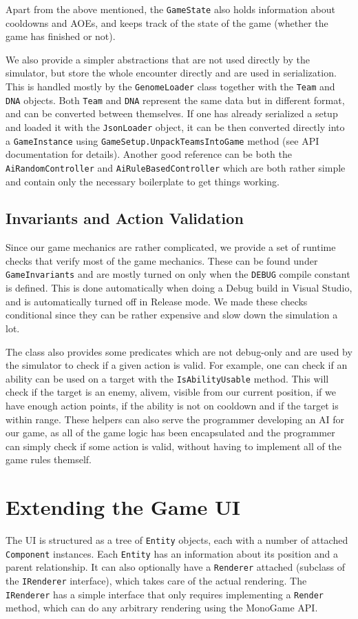 Apart from the above mentioned, the \verb|GameState| also holds information about cooldowns and AOEs, and keeps track of the state of the game (whether the game has finished or not).

We also provide a simpler abstractions that are not used directly by the simulator, but store the whole encounter directly and are used in serialization. This is handled mostly by the \verb|GenomeLoader| class together with the \verb|Team| and \verb|DNA| objects. Both \verb|Team| and \verb|DNA| represent the same data but in different format, and can be converted between themselves. If one has already serialized a setup and loaded it with the \verb|JsonLoader| object, it can be then converted directly into a \verb|GameInstance| using \verb|GameSetup.UnpackTeamsIntoGame| method (see API documentation for details). Another good reference can be both the \verb|AiRandomController| and \verb|AiRuleBasedController| which are both rather simple and contain only the necessary boilerplate to get things working.

\subsection{Invariants and Action Validation}
\label{sec:invariants}

Since our game mechanics are rather complicated, we provide a set of runtime checks that verify most of the game mechanics. These can be found under \verb|GameInvariants| and are mostly turned on only when the \verb|DEBUG| compile constant is defined. This is done automatically when doing a Debug build in Visual Studio, and is automatically turned off in Release mode. We made these checks conditional since they can be rather expensive and slow down the simulation a lot.

The class also provides some predicates which are not debug-only and are used by the simulator to check if a given action is valid. For example, one can check if an ability can be used on a target with the \verb|IsAbilityUsable| method. This will check if the target is an enemy, alivem, visible from our current position, if we have enough action points, if the ability is not on cooldown and if the target is within range. These helpers can also serve the programmer developing an AI for our game, as all of the game logic has been encapsulated and the programmer can simply check if some action is valid, without having to implement all of the game rules themself.

\section{Extending the Game UI}

The UI is structured as a tree of \verb|Entity| objects, each with a number of attached \verb|Component| instances. Each \verb|Entity| has an information about its position and a parent relationship. It can also optionally have a \verb|Renderer| attached (subclass of the \verb|IRenderer| interface), which takes care of the actual rendering. The \verb|IRenderer| has a simple interface that only requires implementing a \verb|Render| method, which can do any arbitrary rendering using the MonoGame \citep{monogame} API.